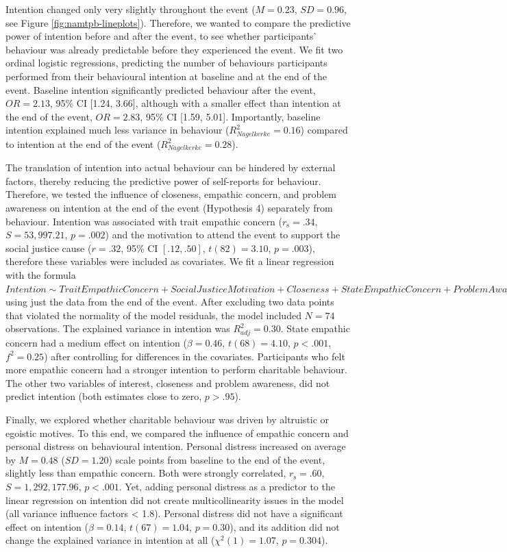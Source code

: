 \documentclass[
  man,floatsintext]{apa6}
\begin{document}
Intention changed only very slightly throughout the event (\(M = 0.23\), \(SD = 0.96\), see Figure \ref{fig:namtpb-lineplots}). Therefore, we wanted to compare the predictive power of intention before and after the event, to see whether participants' behaviour was already predictable before they experienced the event. We fit two ordinal logistic regressions, predicting the number of behaviours participants performed from their behavioural intention at baseline and at the end of the event. Baseline intention significantly predicted behaviour after the event, \(OR = 2.13\), 95\% CI {[}1.24, 3.66{]}, although with a smaller effect than intention at the end of the event, \(OR = 2.83\), 95\% CI {[}1.59, 5.01{]}. Importantly, baseline intention explained much less variance in behaviour (\(R_{Nagelkerke}^2 = 0.16\)) compared to intention at the end of the event (\(R_{Nagelkerke}^2 = 0.28\)).

The translation of intention into actual behaviour can be hindered by external factors, thereby reducing the predictive power of self-reports for behaviour. Therefore, we tested the influence of closeness, empathic concern, and problem awareness on intention at the end of the event (Hypothesis 4) separately from behaviour. Intention was associated with trait empathic concern (\(r_{\mathrm{s}} = .34\), \(S = 53,997.21\), \(p = .002\)) and the motivation to attend the event to support the social justice cause (\(r = .32\), 95\% CI \([.12, .50]\), \(t(82) = 3.10\), \(p = .003\)), therefore these variables were included as covariates. We fit a linear regression with the formula \(Intention \sim Trait Empathic Concern + Social Justice Motivation + Closeness + State Empathic Concern + Problem Awareness\) using just the data from the end of the event. After excluding two data points that violated the normality of the model residuals, the model included \(N = 74\) observations. The explained variance in intention was \(R_{adj}^2 = 0.30\). State empathic concern had a medium effect on intention (\(\beta = 0.46\), \(t (68) = 4.10\), \(p < .001\), \(f^2 = 0.25\)) after controlling for differences in the covariates. Participants who felt more empathic concern had a stronger intention to perform charitable behaviour. The other two variables of interest, closeness and problem awareness, did not predict intention (both estimates close to zero, \(p > .95\)).

Finally, we explored whether charitable behaviour was driven by altruistic or egoistic motives. To this end, we compared the influence of empathic concern and personal distress on behavioural intention. Personal distress increased on average by \(M = 0.48\) (\(SD = 1.20\)) scale points from baseline to the end of the event, slightly less than empathic concern. Both were strongly correlated, \(r_{\mathrm{s}} = .60\), \(S = 1,292,177.96\), \(p < .001\). Yet, adding personal distress as a predictor to the linear regression on intention did not create multicollinearity issues in the model (all variance influence factors \textless{} 1.8). Personal distress did not have a significant effect on intention (\(\beta = 0.14\), \(t (67) = 1.04\), \(p = 0.30\)), and its addition did not change the explained variance in intention at all (\(\chi^2 (1) = 1.07\), \(p = 0.304\)).
\end{document}
